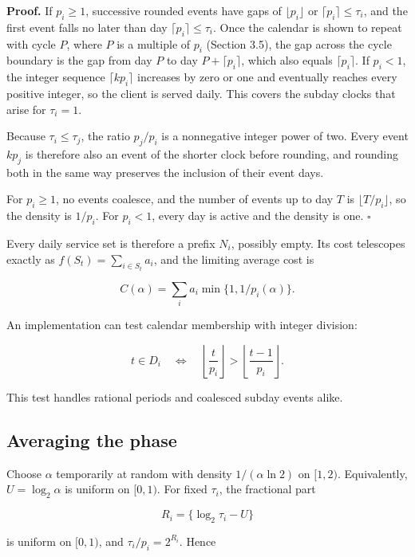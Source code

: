 \documentclass[
  british,
  11pt,
  a4paper,
]{article}
\begin{document}
\textbf{Proof.} If \(p_i\ge1\), successive rounded events have gaps of
\(\lfloor p_i\rfloor\) or \(\lceil p_i\rceil\le\tau_i\), and the first
event falls no later than day \(\lceil p_i\rceil\le\tau_i\). Once the
calendar is shown to repeat with cycle \(P\), where \(P\) is a multiple
of \(p_i\) (Section 3.5), the gap across the cycle boundary is the gap
from day \(P\) to day \(P+\lceil p_i\rceil\), which also equals
\(\lceil p_i\rceil\). If \(p_i<1\), the integer sequence
\(\lceil k p_i\rceil\) increases by zero or one and eventually reaches
every positive integer, so the client is served daily. This covers the
subday clocks that arise for \(\tau_i=1\).

Because \(\tau_i\le\tau_j\), the ratio \(p_j/p_i\) is a nonnegative
integer power of two. Every event \(k p_j\) is therefore also an event
of the shorter clock before rounding, and rounding both in the same way
preserves the inclusion of their event days.

For \(p_i\ge1\), no events coalesce, and the number of events up to day
\(T\) is \(\lfloor T/p_i\rfloor\), so the density is \(1/p_i\). For
\(p_i<1\), every day is active and the density is one. \(\square\)

Every daily service set is therefore a prefix \(N_i\), possibly empty.
Its cost telescopes exactly as \(f(S_t)=\sum_{i\in S_t}a_i\), and the
limiting average cost is

\[
C(\alpha)=\sum_i a_i\min\{1,1/p_i(\alpha)\}. \tag{9}
\]

An implementation can test calendar membership with integer division:

\[
t\in D_i\quad\Longleftrightarrow\quad
\left\lfloor\frac{t}{p_i}\right\rfloor>
\left\lfloor\frac{t-1}{p_i}\right\rfloor. \tag{10}
\]

This test handles rational periods and coalesced subday events alike.

\subsection{Averaging the phase}\label{averaging-the-phase}

Choose \(\alpha\) temporarily at random with density \(1/(\alpha\ln2)\)
on \([1,2)\). Equivalently, \(U=\log_2\alpha\) is uniform on \([0,1)\).
For fixed \(\tau_i\), the fractional part

\[
R_i=\{\log_2\tau_i-U\}
\]

is uniform on \([0,1)\), and \(\tau_i/p_i=2^{R_i}\). Hence
\end{document}
